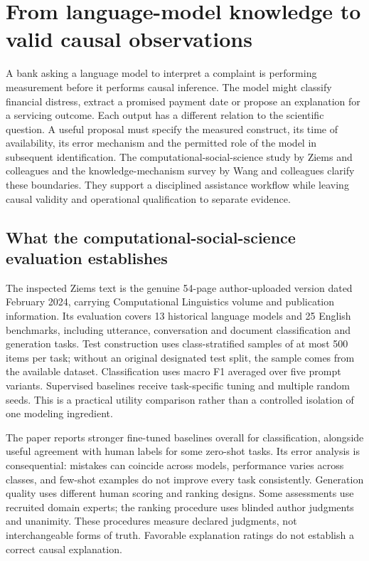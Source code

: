 \section{From language-model knowledge to valid causal observations}
\label{sec:exec24-css-knowledge}
A bank asking a language model to interpret a complaint is performing measurement before it performs causal inference. The model might classify financial distress, extract a promised payment date or propose an explanation for a servicing outcome. Each output has a different relation to the scientific question. A useful proposal must specify the measured construct, its time of availability, its error mechanism and the permitted role of the model in subsequent identification. The computational-social-science study by Ziems and colleagues and the knowledge-mechanism survey by Wang and colleagues clarify these boundaries. They support a disciplined assistance workflow while leaving causal validity and operational qualification to separate evidence.~\citep{exec24_css_original,exec24_knowledge_original,exec24_css_knowledge_reference}

\subsection{What the computational-social-science evaluation establishes}
The inspected Ziems text is the genuine 54-page author-uploaded version dated February 2024, carrying Computational Linguistics volume and publication information. Its evaluation covers 13 historical language models and 25 English benchmarks, including utterance, conversation and document classification and generation tasks. Test construction uses class-stratified samples of at most 500 items per task; without an original designated test split, the sample comes from the available dataset. Classification uses macro F1 averaged over five prompt variants. Supervised baselines receive task-specific tuning and multiple random seeds. This is a practical utility comparison rather than a controlled isolation of one modeling ingredient.~\citep{exec24_css_original}

The paper reports stronger fine-tuned baselines overall for classification, alongside useful agreement with human labels for some zero-shot tasks. Its error analysis is consequential: mistakes can coincide across models, performance varies across classes, and few-shot examples do not improve every task consistently. Generation quality uses different human scoring and ranking designs. Some assessments use recruited domain experts; the ranking procedure uses blinded author judgments and unanimity. These procedures measure declared judgments, not interchangeable forms of truth. Favorable explanation ratings do not establish a correct causal explanation.~\citep{exec24_css_original}

